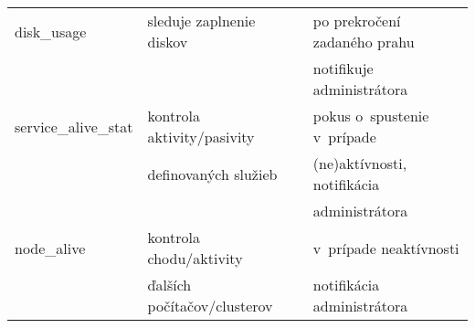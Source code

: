 \begin{tabular}{ | l | l | l | }
	{disk\_usage} & {sleduje zaplnenie diskov} & po prekročení zadaného prahu \\
	& &  notifikuje administrátora \\ \hline
	
	{service\_alive\_stat} &{kontrola aktivity/pasivity}  & pokus o~spustenie v~prípade\\
	&{definovaných služieb} & (ne)aktívnosti, notifikácia \\
	& & administrátora \\ \hline
	
	{node\_alive} & kontrola chodu/aktivity  &  v~prípade neaktívnosti\\
	& ďalších počítačov/clusterov &  notifikácia administrátora \\ \hline
	

\end{tabular}
\newpage

